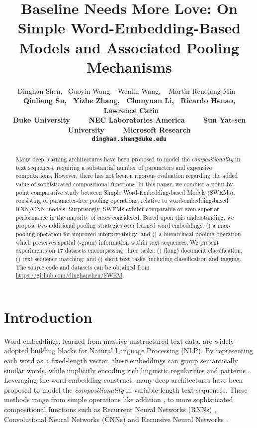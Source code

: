 \documentclass[11pt,a4paper]{article}
\title{Baseline Needs More Love: On Simple Word-Embedding-Based Models and Associated Pooling Mechanisms}
\author{Dinghan Shen, ~Guoyin Wang, ~Wenlin Wang, ~	Martin Renqiang Min 
	\smallskip 
~  \\
	\bf{Qinliang Su, ~Yizhe Zhang, ~Chunyuan Li, ~Ricardo Henao, ~Lawrence Carin} \\
	\smallskip 
	 Duke University~~~~
	 NEC Laboratories America~~~~
	 Sun Yat-sen University~~~~
	 Microsoft Research \\
{\tt dinghan.shen@duke.edu} 
	}
\date{}
\begin{document}
\maketitle

\begin{abstract}
Many deep learning architectures have been proposed to model the \emph{compositionality} in text sequences, requiring a substantial number of parameters and expensive computations.
However, there has not been a rigorous evaluation regarding the added value of sophisticated compositional functions.
In this paper, we conduct a point-by-point comparative study between Simple Word-Embedding-based Models (SWEMs), consisting of parameter-free pooling operations, relative to word-embedding-based RNN/CNN models.
Surprisingly, SWEMs exhibit comparable or even superior performance in the majority of cases considered.
Based upon this understanding, we propose two additional pooling strategies over learned word embeddings: () a max-pooling operation for improved interpretability; and () a hierarchical pooling operation, which preserves spatial (-gram) information within text sequences.
We present experiments on 17 datasets encompassing three tasks: () (long) document classification; () text sequence matching; and () short text tasks, including classification and tagging.
The source code and datasets can be obtained from \url{https://github.com/dinghanshen/SWEM}.
\end{abstract}
\section{Introduction}\label{introduction}
Word embeddings, learned from massive unstructured text data, are widely-adopted building blocks for Natural Language Processing (NLP).
By representing each word as a fixed-length vector, these embeddings can group semantically similar words, while implicitly encoding rich linguistic regularities and patterns \citep{bengio2003neural, mikolov2013distributed, pennington2014glove}.
Leveraging the word-embedding construct, many deep architectures have been proposed to model the \emph{compositionality} in variable-length text sequences.
These methods range from simple operations like addition \citep{mitchell2010composition, iyyer2015deep}, to more sophisticated compositional functions such as Recurrent Neural Networks (RNNs) \citep{tai2015improved, sutskever2014sequence}, Convolutional Neural Networks (CNNs) \citep{kalchbrenner2014convolutional, kim2014convolutional, Zhang2017AdversarialFM} and Recursive Neural Networks \citep{socher2011parsing}.
\end{document}
